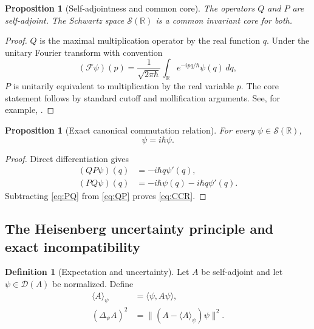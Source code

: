 \documentclass[11pt]{amsart}
\numberwithin{equation}{section}
\theoremstyle{plain}
\newtheorem{proposition}[theorem]{Proposition}
\theoremstyle{definition}
\newtheorem{definition}[theorem]{Definition}
\theoremstyle{remark}
\newcommand{\R}{\mathbb{R}}
\newcommand{\Sch}{\mathcal{S}}
\newcommand{\Four}{\mathcal{F}}
\newcommand{\Dom}{\mathcal{D}}
\begin{document}
\begin{proposition}[Self-adjointness and common core]
\label{prop:self_adjoint_QP}
The operators $Q$ and $P$ are self-adjoint.  The Schwartz space
$\Sch(\R)$ is a common invariant core for both.
\end{proposition}

\begin{proof}
$Q$ is the maximal multiplication operator by the real function $q$.  Under
the unitary Fourier transform with convention
\begin{equation}
(\Four\psi)(p)
=
\frac{1}{\sqrt{2\pi\hbar}}
\int_{\R}e^{-ipq/\hbar}\psi(q)\,dq,
\label{eq:fourier_transform}
\end{equation}
$P$ is unitarily equivalent to multiplication by the real variable $p$.
The core statement follows by standard cutoff and mollification arguments.
See, for example, \cite{ReedSimon1980}.
\end{proof}

\begin{proposition}[Exact canonical commutation relation]
\label{prop:CCR}
For every $\psi\in\Sch(\R)$,
\begin{equation}
[Q,P]\psi=i\hbar\psi.
\label{eq:CCR}
\end{equation}
\end{proposition}

\begin{proof}
Direct differentiation gives
\begin{align}
(QP\psi)(q)
&=-i\hbar q\psi'(q),
\label{eq:QP}\\
(PQ\psi)(q)
&=-i\hbar\psi(q)-i\hbar q\psi'(q).
\label{eq:PQ}
\end{align}
Subtracting \eqref{eq:PQ} from \eqref{eq:QP} proves \eqref{eq:CCR}.
\end{proof}

\subsection{The Heisenberg uncertainty principle and exact incompatibility}
\label{subsec:heisenberg_uncertainty}

\begin{definition}[Expectation and uncertainty]
\label{def:uncertainty}
Let \(A\) be self-adjoint and let \(\psi\in\Dom(A)\) be normalized.  Define
\begin{align}
\langle A\rangle_\psi
&=\langle\psi,A\psi\rangle,
\label{eq:expectation_definition}\\
(\Delta_\psi A)^2
&=\|(A-\langle A\rangle_\psi)\psi\|^2.
\label{eq:variance_definition}
\end{align}
\end{definition}
\end{document}
